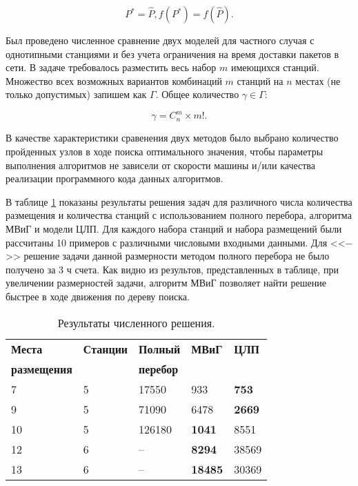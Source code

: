 \begin{displaymath}
    P^{*} = \widehat{P},  f(P^*) = f(\widehat{P}).
\end{displaymath}

Был проведено численное сравнение двух моделей для частного случая с однотипными станциями и без учета ограничения на время доставки пакетов в сети. В задаче требовалось разместить весь набор $m$ имеющихся станций. Множество всех возможных вариантов комбинаций $m$ станций на  $n$ местах (не только допустимых) запишем как $\Gamma$. Общее количество $\gamma \in \Gamma$:

\begin{displaymath}
\gamma = C_n^m \times m!.
\end{displaymath} 
 
В качестве характеристики сравенения двух методов было выбрано количество пройденных узлов в ходе поиска оптимального значения, чтобы параметры выполнения алгоритмов не зависели от скорости машины и/или качества реализации программного кода данных алгоритмов.

В таблице \cref{tab:problems_BF_BnB_ILP} показаны результаты решения задач для различного числа количества размещения и количества станций с использованием полного перебора, алгоритма МВиГ и модели ЦЛП. Для каждого набора станций и набора размещений были рассчитаны 10 примеров с различными числовыми входными данными. Для <<$-$>> решение задачи данной размерности методом полного перебора не было получено за 3 ч счета. 
Как видно из результов, представленных в таблице, при увеличении размерностей задачи, алгоритм МВиГ позволяет найти решение быстрее в ходе движения по дереву поиска.

\begin{table}[b]\centering
    \caption{Результаты численного решения.}\label{tab:problems_BF_BnB_ILP}
    \begin{tabular}{|l|l|l|l|l|}
    \hline
    \textbf{Места} & \textbf{Станции} &	\textbf{Полный}& \textbf{МВиГ} & \textbf{ЦЛП} \\ 
    \textbf{размещения} &  &	\textbf{перебор}&  &  \\
    \hline
    7 &		5 &	17550  &	933 &		\textbf{753}\\
    9 &		5 &	71090  &	6478 &		\textbf{2669}\\
    10 &	5 &	126180 &	\textbf{1041} &		8551\\
    12 &	6 &	-- &		\textbf{8294} &		38569\\
    13 & 	6 &	-- &		\textbf{18485} &	30369\\
    \hline
    \end{tabular}
\end{table}
    


